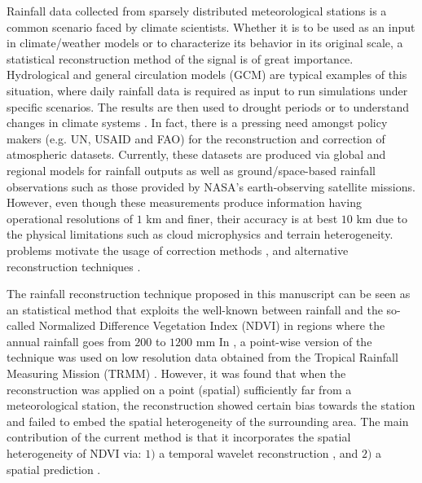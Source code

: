 Rainfall data collected from sparsely distributed meteorological stations is a common scenario faced by climate scientists. Whether it is to be used as an input in climate/weather models or to characterize its behavior in its original scale, a statistical reconstruction method of the signal is of great importance. Hydrological and general circulation models (GCM) are typical examples of this situation, where daily rainfall data is required as input to run simulations under specific scenarios. The results are then used to  drought periods or to understand changes in climate systems  \citep{lloyd}.  In fact, there is a pressing need amongst policy makers (e.g. UN, USAID and FAO) for the reconstruction and correction of atmospheric datasets. Currently, these datasets are produced via global and regional models for rainfall outputs as well as  ground/space-based rainfall observations such as those provided by  NASA's earth-observing satellite missions. However, even though these measurements produce information having operational resolutions of $1$ km and finer, their accuracy is at best $10$ km due to the physical limitations such as cloud microphysics and terrain heterogeneity.   problems motivate the usage of correction methods \citep{Hwang-Graham_2013}, and alternative reconstruction techniques \citep{Duffaut-et-al_2017,Hartkamp-et-al_99,Heidinger-et-al_2012,Hijmans-et-al_2005,Hutchinson_95,Lovejoy-Schertzer_2013,Price-et-al_2000,Posadas-et-al_2015,Quiroz-et-al_2011}.

The rainfall reconstruction technique proposed in this manuscript can be seen as an statistical method that exploits the well-known  between rainfall and the so-called Normalized Difference Vegetation Index (NDVI) in regions where the annual rainfall goes from $200$ to $1200$ mm  In \citep{Heidinger-et-al_2012,Quiroz-et-al_2011}, a point-wise version of the technique was used on low resolution data obtained from the  Tropical Rainfall Measuring Mission (TRMM) \citep{Simpson-et-al_96}. However, it was found that when the reconstruction was applied on a point (spatial) sufficiently far from a meteorological station,  the reconstruction showed certain bias towards the station and failed to embed the spatial heterogeneity of the surrounding area. The main contribution of the current method is that it  incorporates the spatial heterogeneity of NDVI via: $1)$ a temporal wavelet reconstruction \citep{mallat98},  and $2)$ a spatial prediction \citep{Cressie_91}.


